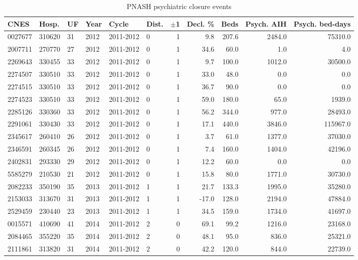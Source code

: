 \begin{table}[p]
\centering
\caption{PNASH psychiatric closure events}
\label{tab:pnash-event-level}
\scriptsize
\setlength{\tabcolsep}{1.5pt}
\renewcommand{\arraystretch}{0.82}
\begin{tabular}{llllllrrrrr}
\toprule
CNES & Hosp. & UF & Year & Cycle & Dist. & $\pm$1 & Decl. \% & Beds & Psych. AIH & Psych. bed-days \\
\midrule
0027677 & 310620 & 31 & 2012 & 2011-2012 & 0 & 1 & 9.8 & 207.6 & 2484.0 & 75310.0 \\
2007711 & 270770 & 27 & 2012 & 2011-2012 & 0 & 1 & 34.6 & 60.0 & 1.0 & 4.0 \\
2269643 & 330455 & 33 & 2012 & 2011-2012 & 0 & 1 & 9.7 & 100.0 & 1012.0 & 30500.0 \\
2274507 & 330510 & 33 & 2012 & 2011-2012 & 0 & 1 & 33.0 & 48.0 & 0.0 & 0.0 \\
2274515 & 330510 & 33 & 2012 & 2011-2012 & 0 & 1 & 36.7 & 90.0 & 0.0 & 0.0 \\
2274523 & 330510 & 33 & 2012 & 2011-2012 & 0 & 1 & 59.0 & 180.0 & 65.0 & 1939.0 \\
2285126 & 330360 & 33 & 2012 & 2011-2012 & 0 & 1 & 56.2 & 344.0 & 977.0 & 28493.0 \\
2291061 & 330430 & 33 & 2012 & 2011-2012 & 0 & 1 & 17.1 & 440.0 & 3846.0 & 115967.0 \\
2345617 & 260410 & 26 & 2012 & 2011-2012 & 0 & 1 & 3.7 & 61.0 & 1377.0 & 37030.0 \\
2346591 & 260345 & 26 & 2012 & 2011-2012 & 0 & 1 & 7.4 & 160.0 & 1404.0 & 42196.0 \\
2402831 & 293330 & 29 & 2012 & 2011-2012 & 0 & 1 & 12.2 & 60.0 & 0.0 & 0.0 \\
5585279 & 210530 & 21 & 2012 & 2011-2012 & 0 & 1 & 15.8 & 80.0 & 1771.0 & 30730.0 \\
2082233 & 350190 & 35 & 2013 & 2011-2012 & 1 & 1 & 21.7 & 133.3 & 1995.0 & 35280.0 \\
2153033 & 313670 & 31 & 2013 & 2011-2012 & 1 & 1 & -17.0 & 128.0 & 2194.0 & 47884.0 \\
2529459 & 230440 & 23 & 2013 & 2011-2012 & 1 & 1 & 34.5 & 159.0 & 1734.0 & 41697.0 \\
0015571 & 410690 & 41 & 2014 & 2011-2012 & 2 & 0 & 69.1 & 99.2 & 1216.0 & 23168.0 \\
2084465 & 355220 & 35 & 2014 & 2011-2012 & 2 & 0 & 48.1 & 95.0 & 836.0 & 25321.0 \\
2111861 & 313820 & 31 & 2014 & 2011-2012 & 2 & 0 & 42.2 & 120.0 & 844.0 & 22739.0 \\

\end{tabular}
\end{table}
